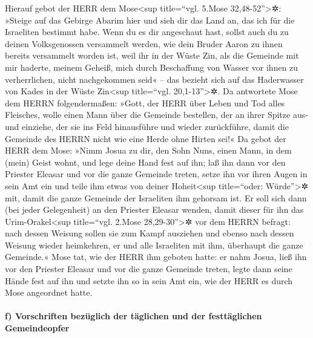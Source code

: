 Hierauf gebot der HERR dem Mose\textless sup title=``vgl.
5.Mose 32,48-52''\textgreater✲: »Steige auf das Gebirge Abarim hier und
sieh dir das Land an, das ich für die Israeliten bestimmt habe.
Wenn du es dir angeschaut hast, sollst auch du zu deinen
Volksgenossen versammelt werden, wie dein Bruder Aaron zu ihnen bereits
versammelt worden ist, weil ihr in der Wüste Zin, als die
Gemeinde mit mir haderte, meinem Geheiß, mich durch Beschaffung von
Wasser vor ihnen zu verherrlichen, nicht nachgekommen seid« -- das
bezieht sich auf das Haderwasser von Kades in der Wüste Zin\textless sup
title=``vgl. 20,1-13''\textgreater✲. Da antwortete Mose
dem HERRN folgendermaßen: »Gott, der HERR über Leben und
Tod alles Fleisches, wolle einen Mann über die Gemeinde bestellen,
der an ihrer Spitze aus- und einziehe, der sie ins Feld
hinausführe und wieder zurückführe, damit die Gemeinde des HERRN nicht
wie eine Herde ohne Hirten sei!« Da gebot der HERR dem
Mose: »Nimm Josua zu dir, den Sohn Nuns, einen Mann, in dem (mein) Geist
wohnt, und lege deine Hand fest auf ihn; laß ihn dann vor
den Priester Eleasar und vor die ganze Gemeinde treten, setze ihn vor
ihren Augen in sein Amt ein und teile ihm etwas von
deiner Hoheit\textless sup title=``oder: Würde''\textgreater✲ mit, damit
die ganze Gemeinde der Israeliten ihm gehorsam ist. Er
soll sich dann (bei jeder Gelegenheit) an den Priester Eleasar wenden,
damit dieser für ihn das Urim-Orakel\textless sup title=``vgl. 2.Mose
28,29-30''\textgreater✲ vor dem HERRN befragt: nach dessen Weisung
sollen sie zum Kampf ausziehen und ebenso nach dessen Weisung wieder
heimkehren, er und alle Israeliten mit ihm, überhaupt die ganze
Gemeinde.« Mose tat, wie der HERR ihm geboten hatte: er
nahm Josua, ließ ihn vor den Priester Eleasar und vor die ganze Gemeinde
treten, legte dann seine Hände fest auf ihn und setzte
ihn so in sein Amt ein, wie der HERR es durch Mose angeordnet hatte.

\hypertarget{f-vorschriften-bezuxfcglich-der-tuxe4glichen-und-der-festtuxe4glichen-gemeindeopfer}{%
\paragraph{f) Vorschriften bezüglich der täglichen und der festtäglichen
Gemeindeopfer}\label{f-vorschriften-bezuxfcglich-der-tuxe4glichen-und-der-festtuxe4glichen-gemeindeopfer}}

